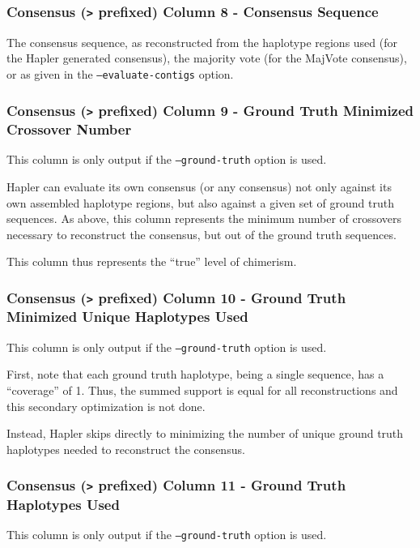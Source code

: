 \documentclass[11pt]{llncs}
\begin{document}
\subsubsection{Consensus (\texttt{>} prefixed) Column 8 - Consensus Sequence}

The consensus sequence, as reconstructed from the haplotype regions used (for the Hapler generated consensus), the majority vote (for the MajVote 
consensus), or as given in the \texttt{--evaluate-contigs} option.

\subsubsection{Consensus (\texttt{>} prefixed) Column 9 - Ground Truth Minimized Crossover Number}

This column is only output if the \texttt{--ground-truth} option is used.

Hapler can evaluate its own consensus (or any consensus) not only against its own assembled haplotype regions, but also against a given set of ground 
truth sequences. As above, this column represents the minimum number of crossovers necessary to reconstruct the consensus, but out of the ground truth
sequences. 

This column thus represents the ``true'' level of chimerism. 

\subsubsection{Consensus (\texttt{>} prefixed) Column 10 - Ground Truth Minimized Unique Haplotypes Used}

This column is only output if the \texttt{--ground-truth} option is used.

First, note that each ground truth haplotype, being a single sequence, has a ``coverage'' of 1. Thus, the summed support is equal for all 
reconstructions and this secondary optimization is not done.

Instead, Hapler skips directly to minimizing the number of unique ground truth haplotypes needed to reconstruct the consensus. 

\subsubsection{Consensus (\texttt{>} prefixed) Column 11 - Ground Truth Haplotypes Used}

This column is only output if the \texttt{--ground-truth} option is used.
\end{document}
